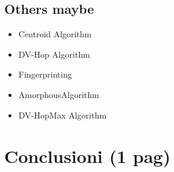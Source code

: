 \documentclass[12pt]{report}
\begin{document}

\section{Others maybe}
\begin{itemize}
    \item Centroid Algorithm
    \item DV-Hop Algorithm
    \item Fingerprinting
    \item AmorphousAlgorithm
    \item DV-HopMax Algorithm
\end{itemize}

\clearpage





\chapter{Conclusioni (1 pag)}









\clearpage
\printbibliography[
heading=bibintoc,
title={Whole bibliography}
]

\clearpage

\printbibliography[heading=subbibintoc,type=article,title={Articles only}]
\end{document}
